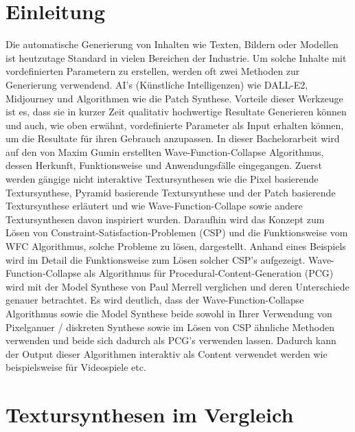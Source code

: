 \documentclass[12pt, a4paper,twoside,openany]{report} %
\begin{document}
\tableofcontents

\chapter{Einleitung}

Die automatische Generierung von Inhalten wie Texten, Bildern oder Modellen ist heutzutage Standard in vielen Bereichen der Industrie.
Um solche Inhalte mit vordefinierten Parametern zu erstellen, werden oft zwei Methoden zur Generierung verwendend.
AI's {(Künstliche Intelligenzen)} wie DALL-E2, Midjourney und Algorithmen wie die Patch Synthese.
Vorteile dieser Werkzeuge ist es, dass sie in kurzer Zeit qualitativ hochwertige Resultate Generieren können und auch, wie oben erwähnt,
vordefinierte Parameter als Input erhalten können, um die Resultate für ihren Gebrauch anzupassen.
In dieser Bachelorarbeit wird auf den von Maxim Gumin erstellten Wave-Function-Collapse Algorithmus, dessen Herkunft, Funktionsweise und Anwendungsfälle eingegangen.
Zuerst werden gängige nicht interaktive Textursynthesen wie die Pixel basierende Textursynthese, Pyramid basierende Textursynthese und der Patch basierende Textursynthese erläutert
und wie Wave-Function-Collape sowie andere Textursynthesen davon inspiriert wurden.
Daraufhin wird das Konzept zum Lösen von Constraint-Satisfaction-Problemen {(CSP)} und die Funktionsweise vom WFC Algorithmus, solche Probleme zu lösen, dargestellt.
Anhand eines Beispiels wird im Detail die Funktionsweise zum Lösen solcher CSP's aufgezeigt.
Wave-Function-Collapse als Algorithmus für Procedural-Content-Generation {(PCG)} wird mit der Model Synthese von Paul Merrell verglichen und deren Unterschiede genauer betrachtet.
Es wird deutlich, dass der Wave-Function-Collapse Algorithmus sowie die Model Synthese beide sowohl in Ihrer Verwendung von Pixelganuer / diskreten Synthese sowie im Lösen von
CSP ähnliche Methoden verwenden und beide sich dadurch als PCG's verwenden lassen.
Dadurch kann der Output dieser Algorithmen interaktiv als Content verwendet werden wie beispielsweise für Videospiele etc.

\chapter{Textursynthesen im Vergleich}
\end{document}

